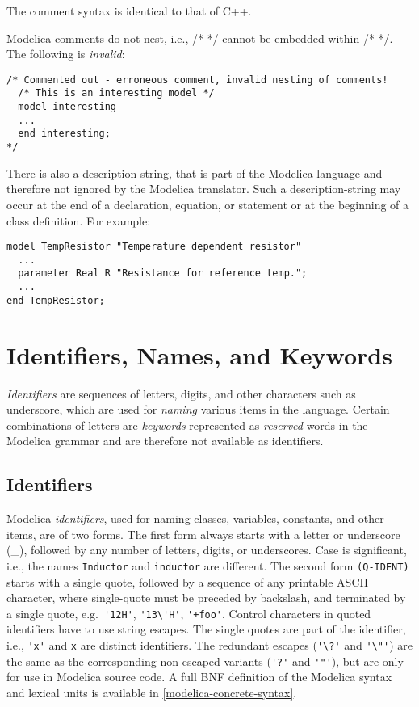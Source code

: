 \begin{nonnormative}
The comment syntax is identical to that of C++.
\end{nonnormative}

Modelica comments do not nest, i.e., /* */ cannot be embedded within /*
*/. The following is \emph{invalid}:
\begin{lstlisting}[language=modelica]
/* Commented out - erroneous comment, invalid nesting of comments!
  /* This is an interesting model */
  model interesting
  ...
  end interesting;
*/
\end{lstlisting}

There is also a description-string, that is part of the Modelica language and
therefore not ignored by the Modelica translator. Such a description-string may
occur at the end of a declaration, equation, or statement or at the
beginning of a class definition. For example:
\begin{lstlisting}[language=modelica]
model TempResistor "Temperature dependent resistor"
  ...
  parameter Real R "Resistance for reference temp.";
  ...
end TempResistor;
\end{lstlisting}

\section{Identifiers, Names, and Keywords}

\emph{Identifiers} are sequences of letters, digits, and other
characters such as underscore, which are used for \emph{naming} various
items in the language. Certain combinations of letters are
\emph{keywords} represented as \emph{reserved} words in the Modelica
grammar and are therefore not available as identifiers.

\subsection{Identifiers}

Modelica \emph{identifiers}, used for naming classes, variables,
constants, and other items, are of two forms. The first form always
starts with a letter or underscore (\_), followed by any number of
letters, digits, or underscores. Case is significant, i.e., the names
\lstinline!Inductor! and \lstinline!inductor! are different. The second form \lstinline!(Q-IDENT)! starts
with a single quote, followed by a sequence of any printable ASCII
character, where single-quote must be preceded by backslash, and
terminated by a single quote, e.g.\ \lstinline!'12H'!, \lstinline!'13\'H'!,
\lstinline!'+foo'!. Control characters in quoted identifiers have to use string
escapes.
The single quotes are part of the identifier, i.e., \lstinline!'x'! and \lstinline!x!
are distinct identifiers. The redundant escapes (\lstinline!'\?'! and \lstinline!'\"'!) are the same as the corresponding non-escaped
variants (\lstinline!'?'! and \lstinline!'"'!), but are only for use in Modelica source code.
A full BNF definition of the Modelica syntax and
lexical units is available in \autoref{modelica-concrete-syntax}.

